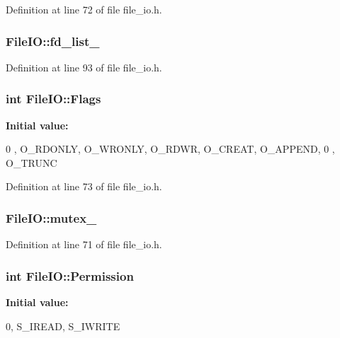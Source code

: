 Definition at line 72 of file file\_\-io.h.

\hypertarget{classmocha_1_1_file_i_o_ab3c13d85dbbf8a8c6c98864af6c57958}{
\subsubsection[{fd\_\-list\_\-}]{ {\bf FileIO::fd\_\-list\_\-}}}
\label{classmocha_1_1_file_i_o_ab3c13d85dbbf8a8c6c98864af6c57958}


Definition at line 93 of file file\_\-io.h.

\hypertarget{classmocha_1_1_file_i_o_a260815d39f51399859e9a86d744e742d}{
\subsubsection[{Flags}]{\setlength{\rightskip}{0pt plus 5cm}int {\bf FileIO::Flags}}}
\label{classmocha_1_1_file_i_o_a260815d39f51399859e9a86d744e742d}
{\bfseries Initial value:}
\begin{DoxyCode}
 {
   0 ,
  O_RDONLY,
  O_WRONLY,
  O_RDWR,
  O_CREAT,
  O_APPEND,
   0 ,
  O_TRUNC
}
\end{DoxyCode}


Definition at line 73 of file file\_\-io.h.

\hypertarget{classmocha_1_1_file_i_o_a014c87164371f39709fb815d3a126fcc}{
\subsubsection[{mutex\_\-}]{ {\bf FileIO::mutex\_\-}}}
\label{classmocha_1_1_file_i_o_a014c87164371f39709fb815d3a126fcc}


Definition at line 71 of file file\_\-io.h.

\hypertarget{classmocha_1_1_file_i_o_aaa0202a641bdb6fa70456cd4947f748c}{
\subsubsection[{Permission}]{\setlength{\rightskip}{0pt plus 5cm}int {\bf FileIO::Permission}}}
\label{classmocha_1_1_file_i_o_aaa0202a641bdb6fa70456cd4947f748c}
{\bfseries Initial value:}
\begin{DoxyCode}
 {
  0,
  S_IREAD,
  S_IWRITE
}
\end{DoxyCode}


